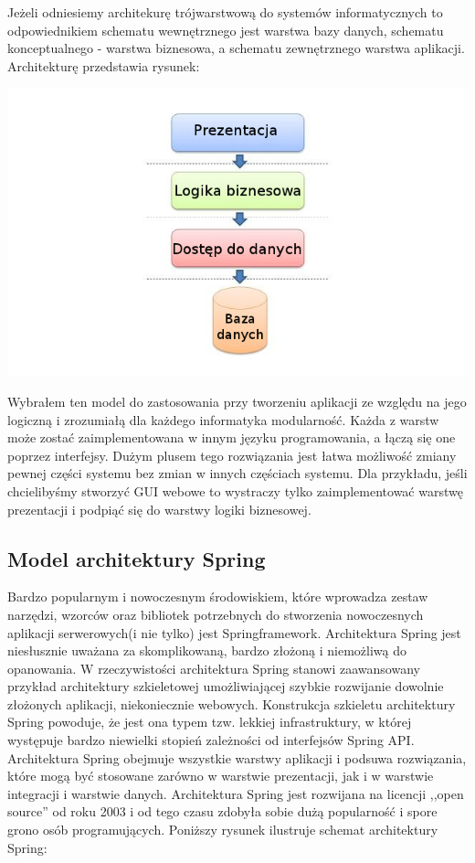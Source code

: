Jeżeli odniesiemy architekurę trójwarstwową do systemów informatycznych to odpowiednikiem schematu wewnętrznego jest warstwa bazy danych, schematu konceptualnego - warstwa biznesowa, a schematu zewnętrznego warstwa aplikacji. Architekturę przedstawia rysunek:

\includegraphics[scale=0.31]{images/3layer-architect}

Wybrałem ten model do zastosowania przy tworzeniu aplikacji ze względu na jego logiczną i zrozumiałą dla każdego informatyka modularność. Każda z warstw może zostać zaimplementowana w innym języku programowania, a łączą się one poprzez interfejsy. Dużym plusem tego rozwiązania jest łatwa możliwość zmiany pewnej części systemu bez zmian w innych częściach systemu. Dla przykładu, jeśli chcielibyśmy stworzyć GUI webowe to wystraczy tylko zaimplementować warstwę prezentacji i podpiąć się do warstwy logiki biznesowej.

\subsection{Model architektury Spring}
\label{sec:modelArchitekturySpring}
Bardzo popularnym i nowoczesnym środowiskiem, które wprowadza zestaw narzędzi, wzorców oraz bibliotek potrzebnych do stworzenia nowoczesnych aplikacji serwerowych(i nie tylko) jest Springframework. Architektura Spring jest niesłusznie uważana za skomplikowaną, bardzo złożoną i niemożliwą do opanowania. W rzeczywistości architektura Spring stanowi zaawansowany przykład architektury szkieletowej umożliwiającej szybkie rozwijanie dowolnie złożonych aplikacji, niekoniecznie webowych. Konstrukcja szkieletu architektury Spring powoduje, że jest ona typem tzw. lekkiej infrastruktury, w której występuje bardzo niewielki stopień zależności od interfejsów Spring API. Architektura Spring obejmuje wszystkie warstwy aplikacji i podsuwa rozwiązania, które mogą być stosowane zarówno w warstwie prezentacji, jak i w warstwie integracji i warstwie danych. Architektura Spring jest rozwijana na licencji ,,open source'' od roku 2003 i od tego czasu zdobyła sobie dużą popularność i spore grono osób programujących. Poniższy rysunek ilustruje schemat architektury Spring:

